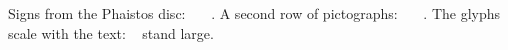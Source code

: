 \documentclass{article}
\begin{document}
Signs from the Phaistos disc: \PHbee\ \PHcat\ \PHdove\ \PHarrow.
A second row of pictographs: \PHbullLeg\ \PHchild\ \PHclub\ \PHcolumn.
The glyphs scale with the text: {\Large\PHbee\ \PHcat} stand large.
\end{document}

